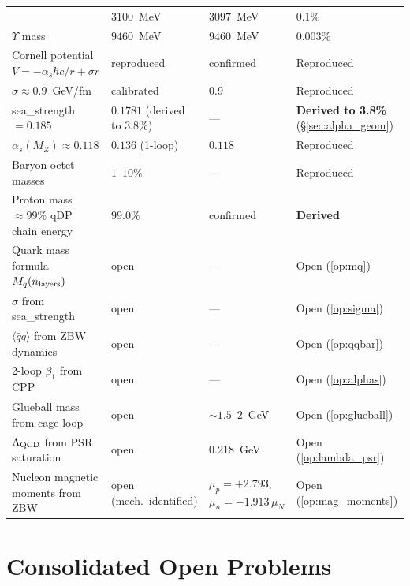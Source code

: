 \documentclass[11pt,a4paper]{article}
\newcommand{\as}{\alpha_s}
\newcommand{\qqbar}{\langle\bar{q}q\rangle}
\begin{document}
\begin{longtable}{@{}p{5.5cm}p{2.5cm}p{2.5cm}l@{}}
  & $3100$~MeV & $3097$~MeV & $0.1\%$ \\
$\Upsilon$ mass
  & $9460$~MeV & $9460$~MeV & $0.003\%$ \\
Cornell potential $V=-\as\hbar c/r+\sigma r$
  & reproduced & confirmed & Reproduced \\
$\sigma \approx 0.9$~GeV/fm
  & calibrated & $0.9$ & Reproduced \\
sea\_strength $= 0.185$
  & $0.1781$ (derived to $3.8\%$) & --- & \textbf{Derived to 3.8\%} (\S\ref{sec:alpha_geom}) \\
$\as(M_Z) \approx 0.118$
  & $0.136$ (1-loop) & $0.118$ & Reproduced \\
Baryon octet masses
  & $1\text{--}10\%$ & --- & Reproduced \\
Proton mass $\approx99\%$ qDP chain energy
  & $99.0\%$ & confirmed & \textbf{Derived} \\
Quark mass formula $M_q(n_{\rm layers})$
  & open & --- & Open (\ref{op:mq}) \\
$\sigma$ from sea\_strength
  & open & --- & Open (\ref{op:sigma}) \\
$\qqbar$ from ZBW dynamics
  & open & --- & Open (\ref{op:qqbar}) \\
2-loop $\beta_1$ from CPP
  & open & --- & Open (\ref{op:alphas}) \\
Glueball mass from cage loop
  & open & $\sim1.5\text{--}2$~GeV & Open (\ref{op:glueball}) \\
$\Lambda_{\rm QCD}$ from PSR saturation
  & open & $0.218$~GeV & Open (\ref{op:lambda_psr}) \\
Nucleon magnetic moments from ZBW
  & open (mech.\ identified) & $\mu_p=+2.793$, $\mu_n=-1.913\,\mu_N$ & Open (\ref{op:mag_moments}) \\
\end{longtable}

\section{Consolidated Open Problems}
\label{sec:openproblems}
\end{document}

